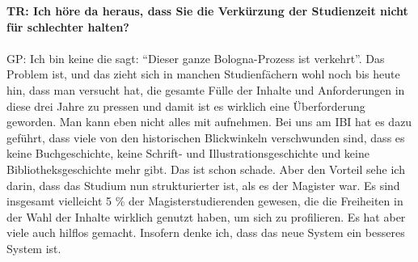 \documentclass[a4paper,
fontsize=11pt,
oneside,
numbers=noperiodatend,
parskip=half-,
bibliography=totoc,
final
]{scrartcl}
\begin{document}
\textbf{TR: Ich höre da heraus, dass Sie die Verkürzung der Studienzeit
nicht für schlechter halten?\\
}~\\
GP: Ich bin keine die sagt: \enquote{Dieser ganze Bologna-Prozess ist
verkehrt}. Das Problem ist, und das zieht sich in manchen Studienfächern
wohl noch bis heute hin, dass man versucht hat, die gesamte Fülle der
Inhalte und Anforderungen in diese drei Jahre zu pressen und damit ist
es wirklich eine Überforderung geworden. Man kann eben nicht alles mit
aufnehmen. Bei uns am IBI hat es dazu geführt, dass viele von den
historischen Blickwinkeln verschwunden sind, dass es keine
Buchgeschichte, keine Schrift- und Illustrationsgeschichte und keine
Bibliotheksgeschichte mehr gibt. Das ist schon schade. Aber den Vorteil
sehe ich darin, dass das Studium nun strukturierter ist, als es der
Magister war. Es sind insgesamt vielleicht 5 \% der Magisterstudierenden
gewesen, die die Freiheiten in der Wahl der Inhalte wirklich genutzt
haben, um sich zu profilieren. Es hat aber viele auch hilflos gemacht.
Insofern denke ich, dass das neue System ein besseres System ist.
\end{document}
